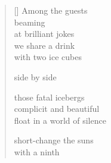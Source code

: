 \documentclass[11pt,a4paper]{article}
\begin{document}
\thispagestyle{empty}


\settowidth{\versewidth}{Among the guests laughing}

\bigskip

\begin{verse}[\versewidth]
  Among the guests \\
  beaming\\
  at brilliant jokes\\
  we share a drink\\
  with two ice cubes

  side by side

  those fatal icebergs\\
  complicit and beautiful\\
  float in a world of silence

  short-change the suns\\
  with a ninth
\end{verse}
\end{document}
